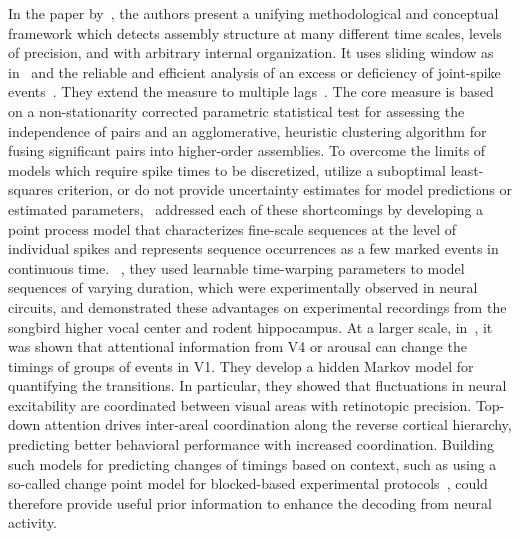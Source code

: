 \documentclass[brainsci, %
               review,accept,pdftex,moreauthors
               ]{Definitions/mdpi}
\begin{document}
In the paper by~\citet{russo_cell_2017}, the authors present a unifying methodological and conceptual framework which detects assembly structure at many different time scales, levels of precision, and with arbitrary internal organization. It uses  sliding window as in~\citep{grun_unitary_2002} and the reliable and efficient analysis of an excess or deficiency of joint-spike events~\citep{pipa_neuroxidence_2008}. They extend the measure to multiple lags~\citep{torre_synchronous_2016}. The core measure is based on a non-stationarity corrected parametric statistical test for assessing the independence of pairs and an agglomerative, heuristic clustering algorithm for fusing significant pairs into higher-order assemblies.  To overcome the limits of models which require spike times to be discretized, utilize a suboptimal least-squares criterion, or do not provide uncertainty estimates for model predictions or estimated parameters,~\citep{williams_point_2020} addressed each of these shortcomings by developing a point process model that characterizes fine-scale sequences at the level of individual spikes and represents sequence occurrences as a few marked events in continuous time. ~\citep{kass_statistical_2005}, they used learnable time-warping parameters to model sequences of varying duration, which were experimentally observed in neural circuits, and demonstrated these advantages on experimental recordings from the songbird higher vocal center and rodent hippocampus.
At a larger scale, in~\citep{van_kempen_top-down_2021}, it was shown that attentional information from V4 or arousal can change the timings of groups of events in V1. They develop a hidden Markov model for quantifying the transitions. In particular, they showed that fluctuations in neural excitability are coordinated between visual areas with retinotopic precision. Top-down attention drives inter-areal coordination along the reverse cortical hierarchy, predicting better behavioral performance with increased coordination. Building such models for predicting changes of timings based on context, such as using a so-called change point model for blocked-based experimental protocols~\citep{pasturel_humans_2020}, could therefore provide useful prior information to enhance the decoding from neural activity.
%
\end{document}

